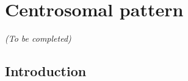 
\section{Centrosomal pattern}
\label{sec:centrosomal}

\begin{center}
	\textit{(To be completed)}
\end{center}

\subsection{Introduction}
\label{subsec:introduction_centrosomal}



